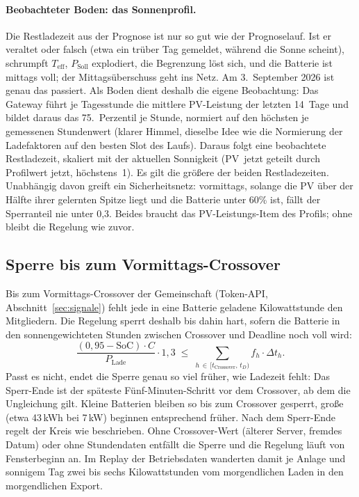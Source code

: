 \documentclass[11pt,a4paper]{article}
\begin{document}
\paragraph{Beobachteter Boden: das Sonnenprofil.} Die Restladezeit aus der
Prognose ist nur so gut wie der Prognoselauf. Ist er veraltet oder falsch
(etwa ein trüber Tag gemeldet, während die Sonne scheint), schrumpft
$T_{\text{eff}}$, $P_{\text{Soll}}$ explodiert, die Begrenzung löst sich,
und die Batterie ist mittags voll; der Mittagsüberschuss geht ins Netz. Am
3.~September 2026 ist genau das passiert. Als Boden dient deshalb die eigene
Beobachtung: Das Gateway führt je Tagesstunde die mittlere PV-Leistung der
letzten 14~Tage und bildet daraus das 75.~Perzentil je Stunde, normiert auf
den höchsten je gemessenen Stundenwert (klarer Himmel, dieselbe Idee wie die
Normierung der Ladefaktoren auf den besten Slot des Laufs). Daraus folgt
eine beobachtete Restladezeit, skaliert mit der aktuellen Sonnigkeit
(PV~jetzt geteilt durch Profilwert jetzt, höchstens~1). Es gilt die
größere der beiden Restladezeiten. Unabhängig davon greift ein
Sicherheitsnetz: vormittags, solange die PV über der Hälfte ihrer gelernten
Spitze liegt und die Batterie unter 60\% ist, fällt der Sperranteil nie
unter 0,3. Beides braucht das PV-Leistungs-Item des Profils; ohne bleibt
die Regelung wie zuvor.

\subsection{Sperre bis zum Vormittags-Crossover}\label{sec:crossoverlock}

Bis zum Vormittags-Crossover der Gemeinschaft (Token-API,
Abschnitt~\ref{sec:signale}) fehlt jede in eine Batterie geladene
Kilowattstunde den Mitgliedern. Die Regelung sperrt deshalb bis dahin hart,
sofern die Batterie in den sonnengewichteten Stunden zwischen Crossover und
Deadline noch voll wird:
\begin{equation}
  \frac{(0{,}95 - \text{SoC}) \cdot C}{P_{\text{Lade}}} \cdot 1{,}3
  \;\leq\; \sum_{h\,\in\,[t_{\text{Crossover}},\,t_D)} f_h \cdot \Delta t_h .
\end{equation}
Passt es nicht, endet die Sperre genau so viel früher, wie Ladezeit fehlt:
Das Sperr-Ende ist der späteste Fünf-Minuten-Schritt vor dem Crossover, ab
dem die Ungleichung gilt. Kleine Batterien bleiben so bis zum Crossover
gesperrt, große (etwa 43\,kWh bei 7\,kW) beginnen entsprechend früher.
Nach dem Sperr-Ende regelt der Kreis wie beschrieben. Ohne Crossover-Wert
(älterer Server, fremdes Datum) oder ohne Stundendaten entfällt die Sperre
und die Regelung läuft von Fensterbeginn an. Im Replay der Betriebsdaten
wanderten damit je Anlage und sonnigem Tag zwei bis sechs Kilowattstunden
vom morgendlichen Laden in den morgendlichen Export.
\end{document}
